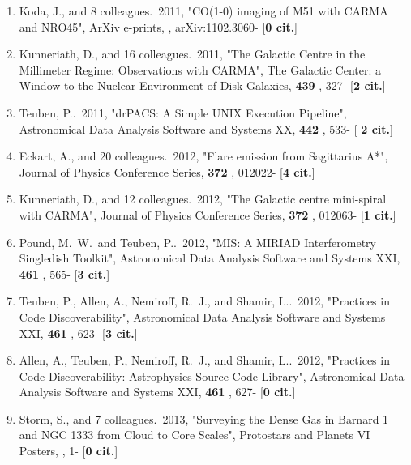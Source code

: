 \documentclass[11pt,letterpaper]{article}
\begin{document}
\begin{enumerate}[resume,label=\textbf{\arabic*}.]
\item  
Koda, J., and 8 colleagues.\  2011,  "CO(1-0) imaging of M51 with CARMA and 
NRO45", ArXiv e-prints,  , arXiv:1102.3060- [{\bf 0 cit.}] 


\item  
Kunneriath, D., and 16 colleagues.\  2011,  "The Galactic Centre in the 
Millimeter Regime: Observations with CARMA", The Galactic Center: a Window 
to the Nuclear Environment of Disk Galaxies,  {\bf 439} , 327- [{\bf 2 
cit.}] 


\item  
Teuben, P..\  2011,  "drPACS: A Simple UNIX Execution Pipeline", 
Astronomical Data Analysis Software and Systems XX,  {\bf 442} , 533- [{\bf 
2 cit.}] 



\item  
Eckart, A., and 20 colleagues.\  2012,  "Flare emission from Sagittarius 
A*", Journal of Physics Conference Series,  {\bf 372} , 012022- [{\bf 4 
cit.}] 

\item  
Kunneriath, D., and 12 colleagues.\  2012,  "The Galactic centre 
mini-spiral with CARMA", Journal of Physics Conference Series,  {\bf 372} , 
012063- [{\bf 1 cit.}] 


\item  
Pound, M.~W.~and Teuben, P..\  2012,  "MIS: A MIRIAD Interferometry 
Singledish Toolkit", Astronomical Data Analysis Software and Systems XXI,  
{\bf 461} , 565- [{\bf 3 cit.}] 

\item  
Teuben, P., Allen, A., Nemiroff, R.~J., and Shamir, L..\  2012,  "Practices 
in Code Discoverability", Astronomical Data Analysis Software and Systems 
XXI,  {\bf 461} , 623- [{\bf 3 cit.}] 

\item  
Allen, A., Teuben, P., Nemiroff, R.~J., and Shamir, L..\  2012,  "Practices 
in Code Discoverability: Astrophysics Source Code Library", Astronomical 
Data Analysis Software and Systems XXI,  {\bf 461} , 627- [{\bf 0 cit.}] 





\item  
Storm, S., and 7 colleagues.\  2013,  "Surveying the Dense Gas in Barnard 1 
and NGC 1333 from Cloud to Core Scales", Protostars and Planets VI Posters,  
, 1- [{\bf 0 cit.}] 


\end{enumerate}
\end{document}
